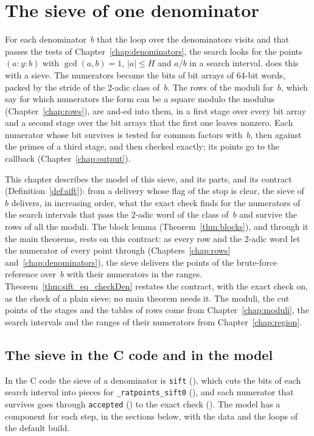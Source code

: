 \chapter{The sieve of one denominator}\label{chap:sieve}

For each denominator~$b$ that the loop over the denominators visits and that passes the tests of
Chapter~\ref{chap:denominators}, the search looks for the points $(a : y : b)$ with
$\gcd(a, b) = 1$, $|a| \le H$ and $a/b$ in a search interval. \ratpoints{} does this with a sieve. The
numerators become the bits of bit arrays of 64-bit words, packed by the stride of the 2-adic class
of~$b$. The rows of the moduli for~$b$, which say for which numerators the form can be a square
modulo the modulus (Chapter~\ref{chap:rows}), are and-ed into them, in a first stage over every bit
array and a second stage over the bit arrays that the first one leaves nonzero. Each numerator whose
bit survives is tested for common factors with~$b$, then against the primes of a third stage, and
then checked exactly; its points go to the callback (Chapter~\ref{chap:output}).

This chapter describes the model of this sieve,  and its parts, and its
contract (Definition~\ref{def:sift}): from a delivery whose flag of the stop is clear, the sieve
of~$b$ delivers, in increasing order, what the exact check finds for the numerators of the search
intervals that pass the 2-adic word of the class of~$b$ and survive the rows of all the moduli. The
block lemma (Theorem~\ref{thm:blocks}), and through it the main theorems, rests on this contract:
as every row and the 2-adic word let the numerator of every point through
(Chapters~\ref{chap:rows} and~\ref{chap:denominators}), the sieve delivers the points of the
brute-force reference over~$b$ with their numerators in the ranges.
Theorem~\ref{thm:sift_eq_checkDen} restates the contract, with the exact check on, as the check of a
plain sieve; no main theorem needs it. The moduli, the cut points of the stages and the tables of
rows come from Chapter~\ref{chap:moduli}, the search intervals and the ranges of their numerators
from Chapter~\ref{chap:region}.

\section{The sieve in the C code and in the model}\label{sec:sieveC}

In the C code the sieve of a denominator is \verb|sift| (), which
cuts the bits of each search interval into pieces for \verb|_ratpoints_sift0|
(), and each numerator that survives goes through \verb|accepted|
() to the exact check (). The model has
a component for each step, in the sections below, with the data and the loops of the default build.

